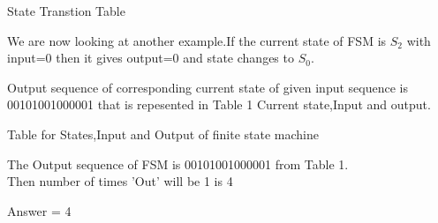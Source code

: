 \documentclass{article}
\begin{document}
\begin{table}[!th]
\centering

\caption{State Transtion Table}
\label{table}
\end{table}


We are now looking at another example.If the current state of FSM is $S_2$ with input=0
then it gives output=0 and state changes to $S_0$.


Output sequence of corresponding current state of given input sequence is 00101001000001
that is repesented in Table 1 Current state,Input and output.


\begin{figure}[h]
\centering

\caption{}
\label{figure}
\end{figure}


\begin{table}[h]
\centering

\caption{Table for States,Input and Output of finite state machine}
\label{table}
\end{table}


The Output sequence of FSM is 00101001000001 from Table 1. \\
Then number of times 'Out' will be 1 is 4

\centering 
Answer = 4
\end{document}
